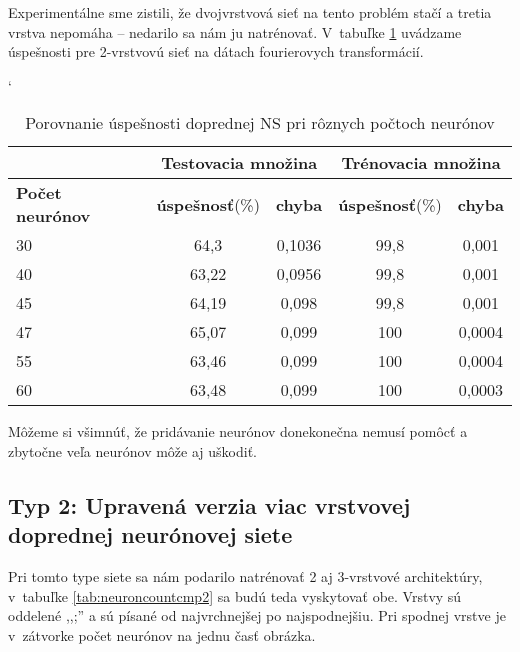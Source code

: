 Experimentálne sme zistili, že dvojvrstvová sieť na tento problém stačí a tretia vrstva nepomáha -- nedarilo sa nám ju natrénovať. V~tabuľke \ref{tab:neuroncountcmp} uvádzame úspešnosti pre 2-vrstvovú sieť na dátach fourierovych transformácií.

\begin{table}[htp]
\catcode` %
\centering
\begin{tabular}{|l|c|c|c|c|}
\cline{2-5}
\multicolumn{1}{l}{} & \multicolumn{2}{|c|}{\textbf{Testovacia množina}} & \multicolumn{2}{c|}{\textbf{Trénovacia množina}}\\ 
\hline
\textbf{Počet neurónov} & \textbf{úspešnosť}(\%) & \textbf{chyba} & \textbf{úspešnosť}(\%) & \textbf{chyba} \\ \hline
30 & 64,3 & 0,1036 & 99,8 & 0,001 \\ \hline
40 & 63,22 & 0,0956 & 99,8 & 0,001 \\ \hline
45 & 64,19 & 0,098 & 99,8 & 0,001 \\ \hline
47 & 65,07 & 0,099 & 100 & 0,0004 \\ \hline
55 & 63,46 & 0,099 & 100 & 0,0004 \\ \hline
60 & 63,48 & 0,099 & 100 & 0,0003 \\ 
\hline
\end{tabular}
\caption{Porovnanie úspešnosti doprednej NS pri rôznych počtoch neurónov}
\label{tab:neuroncountcmp}
\end{table}

Môžeme si všimnúť, že pridávanie neurónov donekonečna nemusí pomôcť a zbytočne veľa neurónov môže aj uškodiť.

\subsection{Typ 2: Upravená verzia viac vrstvovej doprednej neurónovej siete}

Pri tomto type siete sa nám podarilo natrénovať 2 aj 3-vrstvové architektúry, v~tabuľke \ref{tab:neuroncountcmp2} sa budú teda vyskytovať obe. Vrstvy sú oddelené ,,;'' a sú písané od najvrchnejšej po najspodnejšiu. Pri spodnej vrstve je v~zátvorke počet neurónov na jednu časť obrázka.

